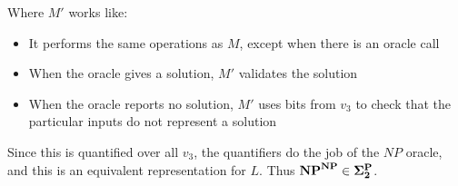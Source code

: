 \documentclass{article}
\newenvironment{problem}[2][Problem]{\begin{trivlist}
\item[\hskip \labelsep {\bfseries #1}\hskip \labelsep {\bfseries #2.}]}{\end{trivlist}}
\begin{document}
\begin{problem}{1}
  Where $M'$ works like:
  
  \begin{itemize}
    \item It performs the same operations as $M$, except when there is
      an oracle call
    \item When the oracle gives a solution, $M'$ validates the
      solution
    \item When the oracle reports no solution, $M'$ uses bits from
      $v_3$ to check that the particular inputs do not represent a solution
  \end{itemize}

  Since this is quantified over all $v_3$, the quantifiers do the job
  of the $NP$ oracle, and this is an equivalent representation for
  $L$. Thus $\bf{NP}^{\bf{NP}} \in \Sigma_2^{\bf{P}}$.
  
\end{problem}
\end{document}
